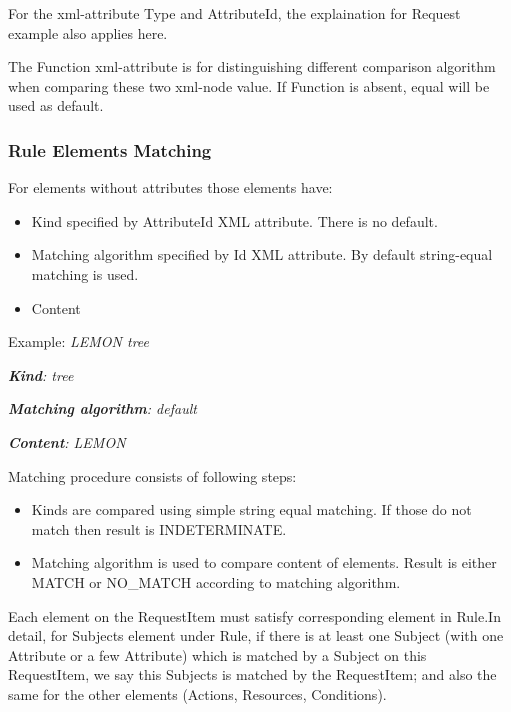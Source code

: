 \documentclass{article}
\newcommand\liststyleWWviiiNumxxii{%
\renewcommand\theenumi{\arabic{enumi}}
\renewcommand\theenumii{\arabic{enumii}}
\renewcommand\theenumiii{\arabic{enumiii}}
\renewcommand\labelitemi{o}
\renewcommand\labelenumi{\theenumi.}
\renewcommand\labelenumii{\theenumii.}
\renewcommand\labelenumiii{\theenumiii.}
}
\newcommand\liststyleWWviiiNumxxiii{%
\renewcommand\theenumi{\arabic{enumi}}
\renewcommand\theenumii{\arabic{enumii}}
\renewcommand\theenumiii{\arabic{enumiii}}
\renewcommand\labelitemi{{}-}
\renewcommand\labelenumi{\theenumi.}
\renewcommand\labelenumii{\theenumii.}
\renewcommand\labelenumiii{\theenumiii.}
}
\begin{document}
{\color{black}
For the xml-attribute {\textquotedbl}Type{\textquotedbl} and
{\textquotedbl}AttributeId{\textquotedbl}, the explaination for Request
example also applies here.}

{\color{black}
The {\textquotedbl}Function{\textquotedbl} xml-attribute is for
distinguishing different comparison algorithm when comparing these two
xml-node value. If Function is absent,
{\textquotedbl}equal{\textquotedbl} will be used as default.}

\subsubsection{Rule Elements Matching}
{\color{black}
For elements without attributes those elements have:}

\liststyleWWviiiNumxxii
\begin{itemize}
\item {\color{black}
Kind specified by AttributeId XML attribute. There is no default.}
\item {\color{black}
Matching algorithm specified by Id XML attribute. By default
string-equal matching is used.}
\item {\color{black}
Content}
\end{itemize}
{\upshape\color{black}
\foreignlanguage{english}{Example:
}\foreignlanguage{english}{\textit{LEMON tree}}}

{\upshape\color{black}
\foreignlanguage{english}{\textbf{\textit{Kind}}}\foreignlanguage{english}{\textit{:
tree}}}

{\upshape\color{black}
\foreignlanguage{english}{\textbf{\textit{Matching
algorithm}}}\foreignlanguage{english}{\textit{: default}}}

{\upshape\color{black}
\foreignlanguage{english}{\textbf{\textit{Content}}}\foreignlanguage{english}{\textit{:
LEMON}}}

{\color{black}
Matching procedure consists of following steps:}

\liststyleWWviiiNumxxiii
\begin{itemize}
\item {\color{black}
Kinds are compared using simple string equal matching. If those do not
match then result is INDETERMINATE.}
\item {\color{black}
Matching algorithm is used to compare content of elements. Result is
either MATCH or NO\_MATCH according to matching algorithm.}
\end{itemize}
{\color{black}
Each element on the RequestItem must satisfy corresponding element in
Rule.In detail, for Subjects element under Rule, if there is at least
one Subject (with one Attribute or a few Attribute) which is matched by
a Subject on this RequestItem, we say this Subjects is matched by the
RequestItem; and also the same for the other elements (Actions,
Resources, Conditions).}
\end{document}
